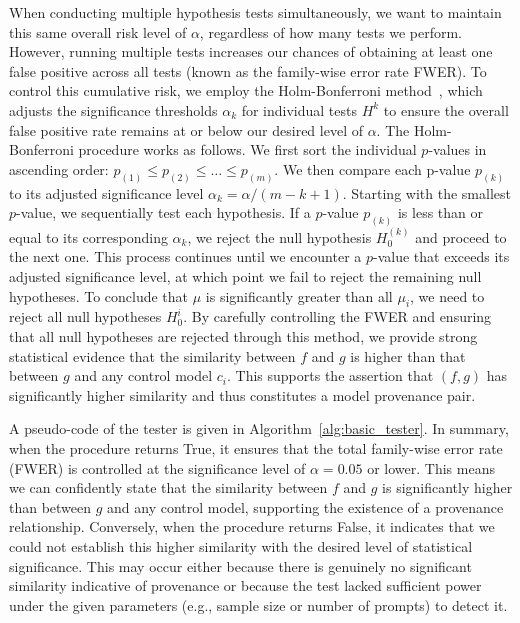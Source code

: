 %
When conducting multiple hypothesis tests simultaneously, we want to maintain this same overall risk level of $\alpha$, regardless of how many tests we perform. However, running multiple tests increases our chances of obtaining at least one false positive across all tests (known as the family-wise error rate FWER). To control this cumulative risk, we employ the Holm-Bonferroni method~\cite{holm1979simple}, which adjusts the significance thresholds $\alpha_k$ for individual tests $H^k$ to ensure the overall false positive rate remains at or below our desired level of $\alpha$.
The Holm-Bonferroni procedure works as follows.
We first sort the individual $p$-values in ascending order: $p_{(1)} \leq p_{(2)} \leq \dots \leq p_{(m)}$. We then compare each p-value $p_{(k)}$ to its adjusted significance level $\alpha_k = \alpha / (m - k + 1)$. Starting with the smallest $p$-value, we sequentially test each hypothesis. 
If a $p$-value $p_{(k)}$ is less than or equal to its corresponding $\alpha_k$, we reject the null hypothesis $H_0^{(k)}$ and proceed to the next one. This process continues until we encounter a $p$-value that exceeds its adjusted significance level, at which point we fail to reject the remaining null hypotheses. To conclude that $\mu$ is significantly greater than all $\mu_i$, we need to reject all null hypotheses $H_0^i$. By carefully controlling the FWER and ensuring that all null hypotheses are rejected through this method, we provide strong statistical evidence that the similarity between $f$ and $g$ is higher than that between $g$ and any control model $c_i$. This supports the assertion that $(f, g)$ has significantly higher similarity and thus constitutes a model provenance pair.




A pseudo-code of the tester is given in Algorithm~\ref{alg:basic_tester}. In summary, when the procedure returns True, it ensures that the total family-wise error rate (FWER) is controlled at the significance level of $\alpha=0.05$  or lower. This means we can confidently state that the similarity between $f$ and $g$ is significantly higher than between $g$ and any control model, supporting the existence of a provenance relationship. Conversely, when the procedure returns False, it indicates that we could not establish this higher similarity with the desired level of statistical significance. This may occur either because there is genuinely no significant similarity indicative of provenance or because the test lacked sufficient power under the given parameters (e.g., sample size or number of prompts) to detect it.



